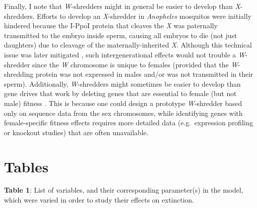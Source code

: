 \documentclass[]{rsos}%
\begin{document}
Finally, I note that \emph{W}-shredders might in general be easier to
develop than \emph{X}-shredders. Efforts to develop an \emph{X}-shredder
in \emph{Anopheles} mosquitos were initially hindered because the I-PpoI
protein that cleaves the \emph{X} was paternally transmitted to the
embryo inside sperm, causing all embryos to die (not just daughters) due
to cleavage of the maternally-inherited \emph{X}. Although this
technical issue was later mitigated \citep{galizi2014sy}, such
intergenerational effects would not trouble a \emph{W}-shredder since
the \emph{W} chromosome is unique to females (provided that the
\emph{W}-shredding protein was not expressed in males and/or was not
transmitted in their sperm). Additionally, \emph{W}-shredders might
sometimes be easier to develop than gene drives that work by deleting
genes that are essential to female (but not male) fitness
\citep[e.g.][]{burt2018se}. This is because one could design a prototype
\emph{W}-shredder based only on sequence data from the sex chromosomes,
while identifying genes with female-specific fitness effects requires
more detailed data (e.g.~expression profiling or knockout studies) that
are often unavailable.

\newpage

\hypertarget{tables}{%
\section{Tables}\label{tables}}

\textbf{Table 1}: List of variables, and their corresponding
parameter(s) in the model, which were varied in order to study their
effects on extinction.
\end{document}
